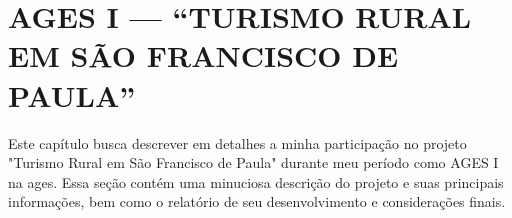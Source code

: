 \chapter[AGES I --- “TURISMO RURAL EM SÃO FRANCISCO DE PAULA”]{AGES I --- “TURISMO RURAL EM SÃO FRANCISCO DE PAULA”}

Este capítulo busca descrever em detalhes a minha participação no projeto "Turismo Rural em São Francisco de Paula" durante meu período como AGES I na \ac{ages}. Essa seção contém uma minuciosa descrição do projeto e suas principais informações, bem como o relatório de seu desenvolvimento e considerações finais. 





